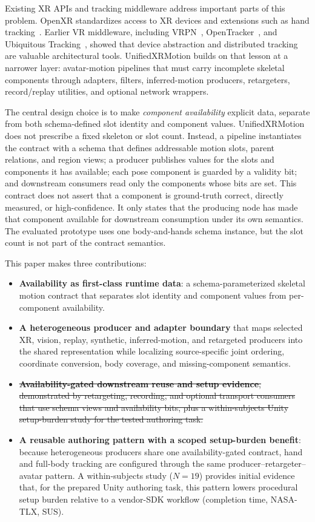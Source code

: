 \documentclass[runningheads]{llncs}
\newcommand{\radd}[1]{\textcolor{revadd}{#1}}
\newcommand{\rdel}[1]{\textcolor{revdel}{\sout{#1}}}
\newcommand{\radd}[1]{#1}
\newcommand{\rdel}[1]{}
\begin{document}
Existing XR APIs and tracking middleware address important parts of this problem. OpenXR standardizes access to XR devices and extensions such as hand tracking~\cite{khronos_openxr_1_0,openxr_ext_hand}. Earlier VR middleware, including VRPN~\cite{taylor2001vrpn}, OpenTracker~\cite{reitmayr2001openarchitecture}, and Ubiquitous Tracking~\cite{newman2004ubiquitous}, showed that device abstraction and distributed tracking are valuable architectural tools. UnifiedXRMotion builds on that lesson at a narrower layer: avatar-motion pipelines that must carry incomplete skeletal components through adapters, filters, inferred-motion producers, retargeters, record/replay utilities, and optional network wrappers.

The central design choice is to make \emph{component availability} explicit data, separate from both schema-defined slot identity and component values. UnifiedXRMotion does not prescribe a fixed skeleton or slot count. Instead, a pipeline instantiates the contract with a schema that defines addressable motion slots, parent relations, and region views; a producer publishes values for the slots and components it has available; each pose component is guarded by a validity bit; and downstream consumers read only the components whose bits are set. This contract does not assert that a component is ground-truth correct, directly measured, or high-confidence. It only states that the producing node has made that component available for downstream consumption under its own semantics. The evaluated prototype uses one body-and-hands schema instance, but the slot count is not part of the contract semantics.

This paper makes three contributions:
\begin{itemize}
	\item \textbf{Availability as first-class runtime data}: a schema-parameterized skeletal motion contract that separates slot identity and component values from per-component availability.
	\item \textbf{A heterogeneous producer and adapter boundary} that maps selected XR, vision, replay, synthetic, inferred-motion, and retargeted producers into the shared representation while localizing source-specific joint ordering, coordinate conversion, body coverage, and missing-component semantics.
	\item \rdel{\textbf{Availability-gated downstream reuse and setup evidence}, demonstrated by retargeting, recording, and optional transport consumers that use schema views and availability bits, plus a within-subjects Unity setup-burden study for the tested authoring task.}%
	\item \radd{\textbf{A reusable authoring pattern with a scoped setup-burden benefit}: because heterogeneous producers share one availability-gated contract, hand and full-body tracking are configured through the same producer--retargeter--avatar pattern. A within-subjects study ($N=19$) provides initial evidence that, for the prepared Unity authoring task, this pattern lowers procedural setup burden relative to a vendor-SDK workflow (completion time, NASA-TLX, SUS).}
\end{itemize}
\end{document}
